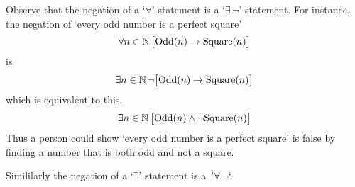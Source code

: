\documentclass[10pt,t]{beamer}
\begin{document}
\begin{frame}
Observe that the negation of a `$\forall$' statement is a `$\exists\,\neg$' 
statement.
For instance, the negation of `every odd number is a perfect square'
\begin{equation*}
  \forall n\in\mathbb{N}\,\big[ \text{Odd}(n)\rightarrow\text{Square}(n)\big]
\end{equation*}
is 
\begin{equation*}
  \exists n\in\mathbb{N}\,\neg\big[ \text{Odd}(n)\rightarrow\text{Square}(n)\big]
\end{equation*}
which is equivalent to this.
\begin{equation*}
  \exists n\in\mathbb{N}\,\big[\text{Odd}(n)\wedge\neg\text{Square}(n)\big]
\end{equation*}
Thus a person could show `every odd number is a perfect square' is false
by finding a number that is both odd and not a square.

\pause
Simililarly the negation of a `$\exists$' statement is a~'$\forall\,\neg$`. 
\end{frame}








% 
\end{document}
